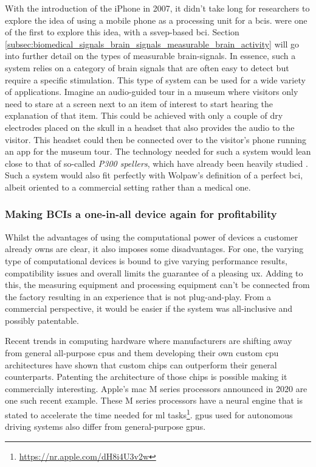 With the introduction of the iPhone in 2007, it didn't take long for researchers to explore the idea of using a mobile phone as a processing unit for a \glspl{bci}.
\citet{early_bci_phone} were one of the first to explore this idea, with a \gls{ssvep}-based \gls{bci}.
Section \ref{subsec:biomedical_signals_brain_signals_measurable_brain_activity} will go into further detail on the types of measurable brain-signals.
In essence, such a system relies on a category of brain signals that are often easy to detect but require a specific stimulation.
This type of system can be used for a wide variety of applications.
Imagine an audio-guided tour in a museum where visitors only need to stare at a screen next to an item of interest to start hearing the explanation of that item.
This could be achieved with only a couple of dry electrodes placed on the skull in a headset that also provides the audio to the visitor.
This headset could then be connected over  to the visitor's phone running an app for the museum tour.
The technology needed for such a system would lean close to that of so-called \textit{P300 spellers}, which have already been heavily studied \citep{p300_spellers_review, p300_keyboard_flashing, p300_spellers}.
Such a system would also fit perfectly with Wolpaw's definition of a perfect \gls{bci}, albeit oriented to a commercial setting rather than a medical one.


\subsubsection{Making BCIs a one-in-all device again for profitability}
\label{subsubsec:bci_gaining_popularity_better_processing_profitibility}

Whilst the advantages of using the computational power of devices a customer already owns are clear, it also imposes some disadvantages.
For one, the varying type of computational devices is bound to give varying performance results, compatibility issues and overall limits the guarantee of a pleasing \gls{ux}.
Adding to this, the measuring equipment and processing equipment can't be connected from the factory resulting in an experience that is not plug-and-play.
From a commercial perspective, it would be easier if the system was all-inclusive and possibly patentable. 

Recent trends in computing hardware where manufacturers are shifting away from general all-purpose \glspl{cpu} and them developing their own custom \gls{cpu} architectures have shown that custom chips can outperform their general counterparts.
Patenting the architecture of those chips is possible making it commercially interesting.
Apple's mac M series processors announced in 2020 are one such recent example.
These M series processors have a neural engine that is stated to accelerate the time needed for \gls{ml} tasks\footnote{\url{https://nr.apple.com/dH8i4U3v2w}}.
\Glspl{gpu} used for autonomous driving systems also differ from general-purpose \glspl{gpu}.

